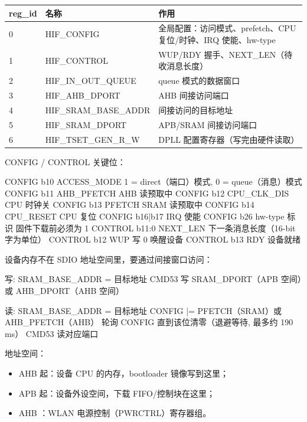 \begin{table}[H]
\centering
\begin{tabular}{llp{8.2cm}}
\toprule
reg\_id & 名称 & 作用 \\
\midrule
0 & HIF\_CONFIG & 全局配置：访问模式、prefetch、CPU 复位/时钟、IRQ 使能、hw-type \\
1 & HIF\_CONTROL & WUP/RDY 握手、NEXT\_LEN（待收消息长度） \\
2 & HIF\_IN\_OUT\_QUEUE & queue 模式的数据窗口 \\
3 & HIF\_AHB\_DPORT & AHB 间接访问端口 \\
4 & HIF\_SRAM\_BASE\_ADDR & 间接访问的目标地址 \\
5 & HIF\_SRAM\_DPORT & APB/SRAM 间接访问端口 \\
6 & HIF\_TSET\_GEN\_R\_W & DPLL 配置寄存器（写完由硬件读取） \\
\bottomrule
\end{tabular}
\end{table}

CONFIG / CONTROL 关键位：

\begin{txtcode}
CONFIG b10 ACCESS_MODE      1 = direct（端口）模式, 0 = queue（消息）模式
CONFIG b11 AHB_PFETCH       AHB 读预取中
CONFIG b12 CPU_CLK_DIS      CPU 时钟关
CONFIG b13 PFETCH           SRAM 读预取中
CONFIG b14 CPU_RESET        CPU 复位
CONFIG b16|b17 IRQ 使能
CONFIG b26 hw-type 标识     固件下载前必须为 1
CONTROL b11:0 NEXT_LEN      下一条消息长度（16-bit 字为单位）
CONTROL b12 WUP             写 0 唤醒设备
CONTROL b13 RDY             设备就绪
\end{txtcode}

设备内存不在 SDIO 地址空间里，要通过间接窗口访问：

\begin{txtcode}
写:  SRAM_BASE_ADDR = 目标地址
     CMD53 写 SRAM_DPORT（APB 空间）或 AHB_DPORT（AHB 空间）

读:  SRAM_BASE_ADDR = 目标地址
     CONFIG |= PFETCH（SRAM）或 AHB_PFETCH（AHB）
     轮询 CONFIG 直到该位清零（退避等待, 最多约 190 ms）
     CMD53 读对应端口
\end{txtcode}

地址空间：

\begin{itemize}
  \item AHB  起：设备 CPU 的内存，bootloader 镜像写到这里；
  \item APB  起：设备外设空间，下载 FIFO/控制块在这里；
  \item AHB ：WLAN 电源控制（PWRCTRL）寄存器组。
\end{itemize}


